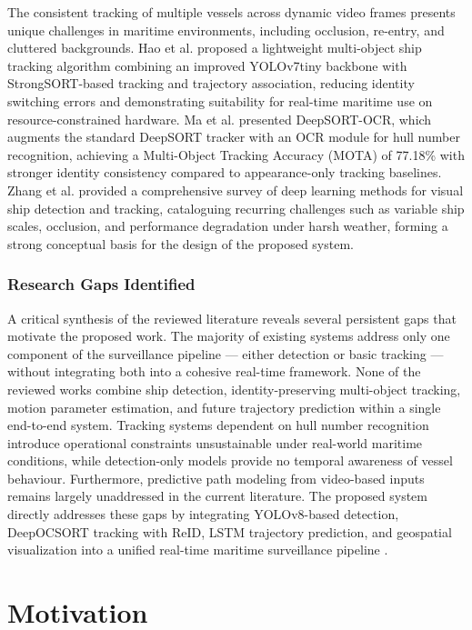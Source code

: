 The consistent tracking of multiple vessels across dynamic video frames presents unique challenges in maritime environments, including occlusion, re-entry, and cluttered backgrounds. Hao et al. \citep{Hao2025} proposed a lightweight multi-object ship tracking algorithm combining an improved YOLOv7tiny backbone with StrongSORT-based tracking and trajectory association, reducing identity switching errors and demonstrating suitability for real-time maritime use on resource-constrained hardware. Ma et al. \citep{Ma2026} presented DeepSORT-OCR, which augments the standard DeepSORT tracker with an OCR module for hull number recognition, achieving a Multi-Object Tracking Accuracy (MOTA) of 77.18\% with stronger identity consistency compared to appearance-only tracking baselines. Zhang et al. \citep{Zhang2025} provided a comprehensive survey of deep learning methods for visual ship detection and tracking, cataloguing recurring challenges such as variable ship scales, occlusion, and performance degradation under harsh weather, forming a strong conceptual basis for the design of the proposed system.

\subsubsection{\textbf{Research Gaps Identified}}


A critical synthesis of the reviewed literature reveals several persistent gaps that motivate the proposed work. The majority of existing systems address only one component of the surveillance pipeline — either detection or basic tracking — without integrating both into a cohesive real-time framework. None of the reviewed works combine ship detection, identity-preserving multi-object tracking, motion parameter estimation, and future trajectory prediction within a single end-to-end system. Tracking systems dependent on hull number recognition introduce operational constraints unsustainable under real-world maritime conditions, while detection-only models provide no temporal awareness of vessel behaviour. Furthermore, predictive path modeling from video-based inputs remains largely unaddressed in the current literature. The proposed system directly addresses these gaps by integrating YOLOv8-based detection, DeepOCSORT tracking with ReID, LSTM trajectory prediction, and geospatial visualization into a unified real-time maritime surveillance pipeline \citep{Hao2025, Zhang2025, Li2025, Jian2025, Ma2026, Yuan2026}.

\section[Motivation]{\textbf{Motivation}}

